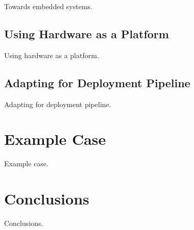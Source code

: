\documentclass[english]{tktltiki2}
\begin{document}
Towards embedded systems.

\subsection{Using Hardware as a Platform}

Using hardware as a platform.

\subsection{Adapting for Deployment Pipeline}

Adapting for deployment pipeline.


\section{Example Case}

Example case.


\section{Conclusions}

Conclusions.




\end{document}
